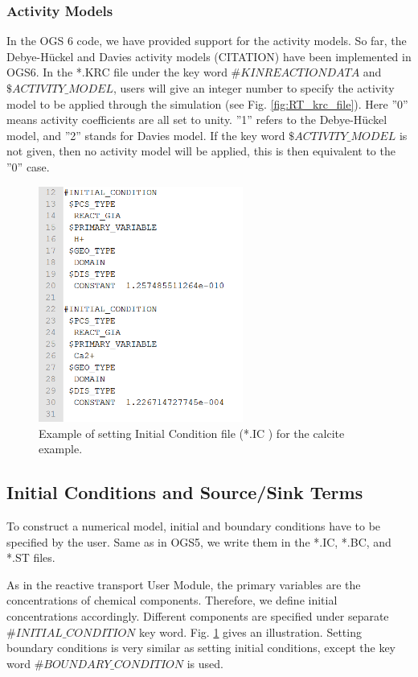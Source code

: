 \subsubsection{Activity Models}

In the OGS 6 code, we have provided support for the activity models. So far, the Debye-H\"uckel and Davies activity models (CITATION) have been implemented in OGS6. In the *.KRC file under the key word $\#KINREACTIONDATA$ and $\$ACTIVITY\_MODEL$, users will give an integer number to specify the activity model to be applied through the simulation (see Fig. \ref{fig:RT_krc_file}). Here ''0'' means activity coefficients are all set to unity. ''1'' refers to the Debye-H\"uckel model, and ''2'' stands for Davies model. If the key word $\$ACTIVITY\_MODEL$ is not given, then no activity model will be applied, this is then equivalent to the ''0'' case. 

\begin{figure}
\includegraphics[width=0.6\textwidth]{RT/figs/RT_fig_ic_file}
\caption{Example of setting Initial Condition file (*.IC ) for the calcite example. }
\label{fig:RT_fig_ic_file}
\end{figure}

\subsection{Initial Conditions and Source/Sink Terms}

To construct a numerical model, initial and boundary conditions have to be specified by the user. Same as in OGS5, we write them in the *.IC, *.BC, and *.ST files. 

As in the reactive transport User Module, the primary variables are the concentrations of chemical components. Therefore, we define initial concentrations accordingly. Different components are specified under separate $\#INITIAL\_CONDITION$ key word. Fig. \ref{fig:RT_fig_ic_file} gives an illustration. Setting boundary conditions is very similar as setting initial conditions, except the key word $\#BOUNDARY\_CONDITION$ is used. 


